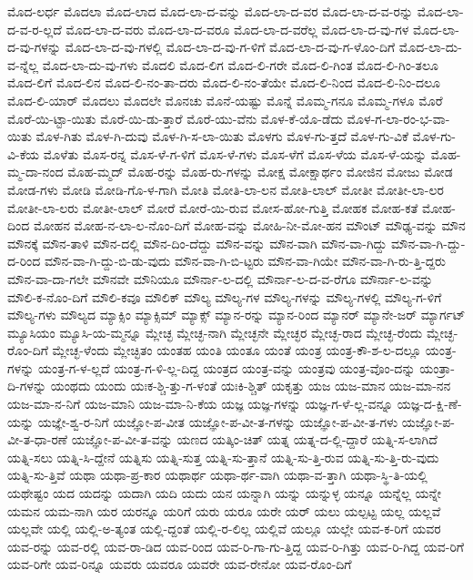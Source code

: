{ಮೊದ-ಲರ್ಧ
ಮೊದಲಾ
ಮೊದ-ಲಾದ
ಮೊದ-ಲಾ-ದ-ವನ್ನು
ಮೊದ-ಲಾ-ದ-ವರ
ಮೊದ-ಲಾ-ದ-ವ-ರನ್ನು
ಮೊದ-ಲಾ-ದ-ವ-ರ-ಲ್ಲದೆ
ಮೊದ-ಲಾ-ದ-ವರು
ಮೊದ-ಲಾ-ದ-ವರೂ
ಮೊದ-ಲಾ-ದ-ವರೆಲ್ಲ
ಮೊದ-ಲಾ-ದ-ವು-ಗಳ
ಮೊದ-ಲಾ-ದ-ವು-ಗಳನ್ನು
ಮೊದ-ಲಾ-ದ-ವು-ಗಳಲ್ಲಿ
ಮೊದ-ಲಾ-ದ-ವು-ಗ-ಳಿಗೆ
ಮೊದ-ಲಾ-ದ-ವು-ಗ-ಳೊಂ-ದಿಗೆ
ಮೊದ-ಲಾ-ದು-ವ-ನ್ನೆಲ್ಲ
ಮೊದ-ಲಾ-ದು-ವು-ಗಳು
ಮೊದಲಿ
ಮೊದ-ಲಿಗ
ಮೊದ-ಲಿ-ಗರೇ
ಮೊದ-ಲಿ-ಗಿಂತ
ಮೊದ-ಲಿ-ಗಿಂ-ತಲೂ
ಮೊದ-ಲಿಗೆ
ಮೊದ-ಲಿನ
ಮೊದ-ಲಿ-ನಂ-ತಾ-ದರು
ಮೊದ-ಲಿ-ನಂ-ತೆಯೇ
ಮೊದ-ಲಿ-ನಿಂದ
ಮೊದ-ಲಿ-ನಿಂ-ದಲೂ
ಮೊದ-ಲಿ-ಯಾರ್
ಮೊದಲು
ಮೊದಲೇ
ಮೊನಚು
ಮೊನೆ-ಯಷ್ಟು
ಮೊನ್ನೆ
ಮೊಮ್ಮ-ಗನೂ
ಮೊಮ್ಮ-ಗಳೂ
ಮೊರೆ
ಮೊರೆ-ಯಿ-ಟ್ಟಾ-ಯಿತು
ಮೊರೆ-ಯಿ-ಡು-ತ್ತಾರೆ
ಮೊರೆ-ಯು-ವೆನು
ಮೊಳ-ಕೆ-ಯೊ-ಡೆದು
ಮೊಳ-ಗ-ಲಾ-ರಂ-ಭ-ವಾ-ಯಿತು
ಮೊಳ-ಗಿತು
ಮೊಳ-ಗಿ-ದುವು
ಮೊಳ-ಗಿ-ಸ-ಲಾ-ಯಿತು
ಮೊಳಗು
ಮೊಳ-ಗು-ತ್ತದೆ
ಮೊಳ-ಗು-ವಿಕೆ
ಮೊಳ-ಗು-ವಿ-ಕೆಯ
ಮೊಳೆತು
ಮೊಸ-ರನ್ನ
ಮೊಸ-ಳೆ-ಗ-ಳಿಗೆ
ಮೊಸ-ಳೆ-ಗಳು
ಮೊಸ-ಳೆಗೆ
ಮೊಸ-ಳೆಯ
ಮೊಸ-ಳೆ-ಯನ್ನು
ಮೊಹ-ಮ್ಮ-ದಾ-ನಂದ
ಮೊಹ-ಮ್ಮದ್
ಮೊಹ-ರನ್ನು
ಮೊಹ-ರು-ಗಳನ್ನು
ಮೋಕ್ಷ
ಮೋಕ್ಷಾರ್ಥಂ
ಮೋಜಿನ
ಮೋಜು
ಮೋಡ
ಮೋಡ-ಗಳು
ಮೋಡಿ
ಮೋಡಿ-ಗೊ-ಳ-ಗಾಗಿ
ಮೋತಿ
ಮೋತಿ-ಲಾ-ಲನ
ಮೋತಿ-ಲಾಲ್
ಮೋತೀ
ಮೋತೀ-ಲಾ-ಲರ
ಮೋತೀ-ಲಾ-ಲರು
ಮೋತೀ-ಲಾಲ್
ಮೋರೆ
ಮೋರೆ-ಯಿ-ರುವ
ಮೋಸ-ಹೋ-ಗುತ್ತಿ
ಮೋಹಕ
ಮೋಹ-ಕತೆ
ಮೋಹ-ದಿಂದ
ಮೋಹನ
ಮೋಹ-ನ-ಲಾ-ಲ-ನೊಂ-ದಿಗೆ
ಮೋಹ-ವನ್ನು
ಮೋಹಿ-ನೀ-ಮೋ-ಹನ
ಮೌಂಟ್
ಮೌಢ್ಯ-ವನ್ನು
ಮೌನ
ಮೌನಕ್ಕೆ
ಮೌನ-ತಾಳಿ
ಮೌನ-ದಲ್ಲಿ
ಮೌನ-ದಿಂ-ದೆದ್ದು
ಮೌನ-ವನ್ನು
ಮೌನ-ವಾಗಿ
ಮೌನ-ವಾ-ಗಿದ್ದು
ಮೌನ-ವಾ-ಗಿ-ದ್ದು-ದ-ರಿಂದ
ಮೌನ-ವಾ-ಗಿ-ದ್ದು-ಬಿ-ಡು-ವುದು
ಮೌನ-ವಾ-ಗಿ-ಬಿ-ಟ್ಟರು
ಮೌನ-ವಾ-ಗಿಯೇ
ಮೌನ-ವಾ-ಗಿ-ರು-ತ್ತಿ-ದ್ದರು
ಮೌನ-ವಾ-ದಾ-ಗಲೇ
ಮೌನವೇ
ಮೌನಿಯೂ
ಮೌರ್ನಾ-ಲ-ದಲ್ಲಿ
ಮೌರ್ನಾ-ಲ-ದ-ವ-ರೆಗೂ
ಮೌರ್ನಾ-ಲ-ವನ್ನು
ಮೌಲಿ-ಕ-ನೊಂ-ದಿಗೆ
ಮೌಲಿ-ಕವೂ
ಮೌಲಿಕ್
ಮೌಲ್ಯ
ಮೌಲ್ಯ-ಗಳ
ಮೌಲ್ಯ-ಗಳನ್ನು
ಮೌಲ್ಯ-ಗಳಲ್ಲಿ
ಮೌಲ್ಯ-ಗ-ಳಿಗೆ
ಮೌಲ್ಯ-ಗಳು
ಮೌಲ್ಯದ
ಮ್ಯಾಕ್ಸಿಂ
ಮ್ಯಾಕ್ಸಿಮ್
ಮ್ಯಾಕ್ಸ್
ಮ್ಯಾನ-ರನ್ನು
ಮ್ಯಾನ-ರಿಂದ
ಮ್ಯಾನರ್
ಮ್ಯಾನೇ-ಜರ್
ಮ್ಯಾರ್ಗಟ್
ಮ್ಯೂಸಿಯಂ
ಮ್ಯೂಸಿ-ಯ-ಮ್ಮನ್ನೂ
ಮ್ಲೇಚ್ಛ
ಮ್ಲೇಚ್ಛ-ನಾಗಿ
ಮ್ಲೇಚ್ಛನೇ
ಮ್ಲೇಚ್ಛರ
ಮ್ಲೇಚ್ಛ-ರಾದ
ಮ್ಲೇಚ್ಛ-ರೆಂದು
ಮ್ಲೇಚ್ಛ-ರೊಂ-ದಿಗೆ
ಮ್ಲೇಚ್ಛ-ಳೆಂದು
ಮ್ಲೇಚ್ಛಿತಂ
ಯಂತಹ
ಯಂತಿ
ಯಂತೂ
ಯಂತೆ
ಯಂತ್ರ
ಯಂತ್ರ-ಕೌ-ಶ-ಲ-ದಲ್ಲೂ
ಯಂತ್ರ-ಗಳನ್ನು
ಯಂತ್ರ-ಗ-ಳ-ಲ್ಲದೆ
ಯಂತ್ರ-ಗ-ಳಿ-ಲ್ಲ-ದಿದ್ದ
ಯಂತ್ರದ
ಯಂತ್ರ-ವನ್ನು
ಯಂತ್ರವು
ಯಂತ್ರ-ವೊಂ-ದನ್ನು
ಯಂತ್ರಾ-ದಿ-ಗಳನ್ನು
ಯಂಥದು
ಯಂದು
ಯಃಕ-ಶ್ಚಿ-ತ್ತು-ಗ-ಳಂತೆ
ಯಃಕಿ-ಶ್ಚಿತ್
ಯಕೃತ್ತು
ಯಜ
ಯಜ-ಮಾನ
ಯಜ-ಮಾ-ನನ
ಯಜ-ಮಾ-ನ-ನಿಗೆ
ಯಜ-ಮಾನಿ
ಯಜ-ಮಾ-ನಿ-ಕೆಯ
ಯಜ್ಞ
ಯಜ್ಞ-ಗಳನ್ನು
ಯಜ್ಞ-ಗ-ಳೆ-ಲ್ಲ-ವನ್ನೂ
ಯಜ್ಞ-ದ-ಕ್ಷಿ-ಣೆ-ಯನ್ನು
ಯಜ್ಞೇ-ಶ್ವ-ರ-ನಿಗೆ
ಯಜ್ಞೋ-ಪ-ವೀತ
ಯಜ್ಞೋ-ಪ-ವೀ-ತ-ಗಳನ್ನು
ಯಜ್ಞೋ-ಪ-ವೀ-ತ-ಗಳು
ಯಜ್ಞೋ-ಪ-ವೀ-ತ-ಧಾ-ರಣೆ
ಯಜ್ಞೋ-ಪ-ವೀ-ತ-ವನ್ನು
ಯಣದ
ಯತ್ಕಿಂ-ಚಿತ್
ಯತ್ನ
ಯತ್ನ-ದ-ಲ್ಲಿ-ದ್ದಾರೆ
ಯತ್ನಿ-ಸ-ಲಾಗಿದೆ
ಯತ್ನಿ-ಸಲು
ಯತ್ನಿ-ಸಿ-ದ್ದೇನೆ
ಯತ್ನಿಸು
ಯತ್ನಿ-ಸುತ್ತ
ಯತ್ನಿ-ಸು-ತ್ತಾನೆ
ಯತ್ನಿ-ಸು-ತ್ತಿ-ರುವ
ಯತ್ನಿ-ಸು-ತ್ತಿ-ರು-ವುದು
ಯತ್ನಿ-ಸು-ತ್ತಿವೆ
ಯಥಾ
ಯಥಾ-ಪ್ರ-ಕಾರ
ಯಥಾರ್ಥ
ಯಥಾ-ರ್ಥ-ವಾಗಿ
ಯಥಾ-ವ-ತ್ತಾಗಿ
ಯಥಾ-ಸ್ಥಿ-ತಿ-ಯಲ್ಲಿ
ಯಥೇಷ್ಟಂ
ಯದ
ಯದನ್ನು
ಯದಾಗಿ
ಯದಿ
ಯದು
ಯನ
ಯನ್ನಾಗಿ
ಯನ್ನು
ಯನ್ನುಳ್ಳ
ಯನ್ನೂ
ಯನ್ನೆಲ್ಲ
ಯನ್ನೇ
ಯಮನ
ಯಮ-ನಾಗಿ
ಯರ
ಯರನ್ನೂ
ಯರಿಗೆ
ಯರು
ಯರೂ
ಯರೇ
ಯರ್
ಯಲು
ಯಲ್ಪಟ್ಟ
ಯಲ್ಲ
ಯಲ್ಲವೆ
ಯಲ್ಲವೇ
ಯಲ್ಲಿ
ಯಲ್ಲಿ-ಅ-ತ್ಯಂತ
ಯಲ್ಲಿ-ದ್ದಂತೆ
ಯಲ್ಲಿ-ರ-ಲಿಲ್ಲ
ಯಲ್ಲಿವೆ
ಯಲ್ಲೂ
ಯಲ್ಲೇ
ಯವ-ಕ-ರಿಗೆ
ಯವರ
ಯವ-ರನ್ನು
ಯವ-ರಲ್ಲಿ
ಯವ-ರಾ-ಡಿದ
ಯವ-ರಿಂದ
ಯವ-ರಿ-ಗಾ-ಗು-ತ್ತಿದ್ದ
ಯವ-ರಿ-ಗಿತ್ತು
ಯವ-ರಿ-ಗಿದ್ದ
ಯವ-ರಿಗೆ
ಯವ-ರಿಗೇ
ಯವ-ರಿನ್ನೂ
ಯವರು
ಯವರೂ
ಯವರೇ
ಯವ-ರೇನೋ
ಯವ-ರೊಂ-ದಿಗೆ
}
